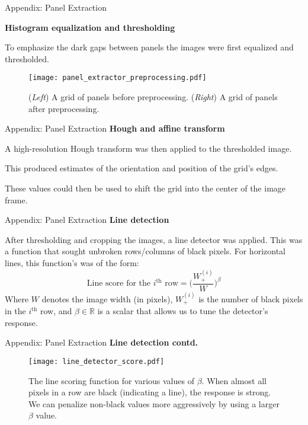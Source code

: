 \documentclass[10pt]{beamer}
\begin{document}
\begin{frame}{Appendix: Panel Extraction}

	\textbf{Histogram equalization and thresholding}
	
	To emphasize the dark gaps between panels the images were first equalized and thresholded.
	\begin{figure}[b]
		\texttt{[image: panel\_extractor\_preprocessing.pdf]}
		\caption{(\emph{Left}) A grid of panels before preprocessing. (\emph{Right}) A grid of panels after preprocessing.}
	\end{figure}
\end{frame}

\begin{frame}{Appendix: Panel Extraction}
	\textbf{Hough and affine transform}
	
	A high-resolution Hough transform was then applied to the thresholded image.
	
	 This produced estimates of the orientation and position of the grid's edges. 
	 
	 These values could then be used to shift the grid into the center of the image frame.
\end{frame}

\begin{frame}{Appendix: Panel Extraction}
	\textbf{Line detection}

	After thresholding and cropping the images, a line detector was applied. This was a function that sought unbroken rows/columns of black pixels. For horizontal lines, this function's was of the form:
	\[
		\text{Line score for the $i^{\text{th}}$ row} = \Big(\frac{W^{(i)}_{+}}{W}\Big)^\beta
	\]
	Where $W$ denotes the image width (in pixels),  $W^{(i)}_{+}$ is the number of black pixels in the $i^{\text{th}}$ row, and $\beta \in \mathbb{R}$ is a scalar that allows us to tune the detector's response. 
\end{frame}

\begin{frame}{Appendix: Panel Extraction}
\textbf{Line detection contd.}

	\begin{figure}
	\texttt{[image: line\_detector\_score.pdf]}
	\caption{The line scoring function for various values of $\beta$.  When almost all pixels in a row are black (indicating a line), the response is strong. We can penalize non-black values more aggressively by using a larger $\beta$ value.}
	\end{figure}
\end{frame}
\end{document}
